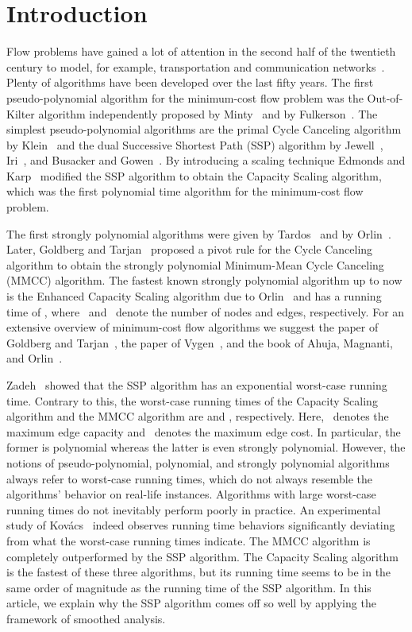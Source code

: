 \documentclass[11pt]{article}
\begin{document}
\section{Introduction}

Flow problems have gained a lot of attention in the second half of the twentieth century to model, for example, transportation and communication networks~\cite{DBLP:books/daglib/0069809,ForFul62}. Plenty of algorithms have been developed over the last fifty years. The first pseudo-polynomial algorithm for the minimum-cost flow problem was the Out-of-Kilter algorithm independently proposed by Minty~\cite{Min60} and by Fulkerson~\cite{Ful61}. The simplest pseudo-polynomial algorithms are the primal Cycle Canceling algorithm by Klein~\cite{Kle67} and the dual Successive Shortest Path (SSP) algorithm by Jewell~\cite{Jew62}, Iri~\cite{Iri60}, and Busacker and Gowen~\cite{BusGow60}. By introducing a scaling technique Edmonds and Karp~\cite{DBLP:journals/jacm/EdmondsK72} modified the SSP algorithm to obtain the Capacity Scaling algorithm, which was the first polynomial time algorithm for the minimum-cost flow problem.

The first strongly polynomial algorithms were given by Tardos~\cite{DBLP:journals/combinatorica/Tardos85} and by Orlin~\cite{Orl84}. Later,
Goldberg and Tarjan~\cite{DBLP:journals/jacm/GoldbergT89} proposed a pivot rule for the Cycle Canceling algorithm to obtain the strongly
polynomial Minimum-Mean Cycle Canceling (MMCC) algorithm. The fastest known strongly polynomial algorithm up to now is the Enhanced Capacity
Scaling algorithm due to Orlin~\cite{Orl93} and has a running time of , where~ and~ denote the number of nodes and edges, respectively. For an extensive overview of
minimum-cost flow algorithms we suggest the paper of Goldberg and Tarjan~\cite{GolTar90}, the paper of Vygen~\cite{Vyg02}, and the book of
Ahuja, Magnanti, and Orlin~\cite{DBLP:books/daglib/0069809}.

Zadeh~\cite{Zad73} showed that the SSP algorithm has an exponential worst-case running time. Contrary to this,
the worst-case running times of the Capacity Scaling algorithm and the MMCC algorithm are  \cite{DBLP:journals/jacm/EdmondsK72} and  \cite{DBLP:journals/algorithmica/RadzikG94}, respectively. Here,~ denotes the maximum edge capacity and~ denotes the maximum edge cost. In particular, the former is polynomial whereas the latter is even strongly polynomial.
However, the notions of pseudo-polynomial, polynomial, and strongly polynomial algorithms always refer to worst-case running times,
which do not always resemble the algorithms' behavior on real-life instances. Algorithms with large worst-case running times do not inevitably perform poorly in practice. An experimental study of Kov{\'a}cs~\cite{Kir14} indeed observes running time behaviors significantly deviating from what the worst-case running times indicate. The MMCC algorithm is completely outperformed by the SSP algorithm. The Capacity Scaling algorithm is the fastest of these three algorithms, but its running time seems to be in the same order of magnitude as the running time of the SSP algorithm.
In this article, we explain why the SSP algorithm comes off so well by applying the framework of smoothed analysis.
\end{document}
